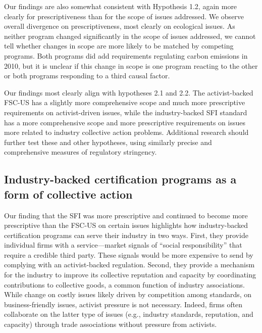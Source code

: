 \documentclass[
      12pt,
            Review ]{article}
\begin{document}
Our findings are also somewhat consistent with Hypothesis 1.2, again
more clearly for prescriptiveness than for the scope of issues
addressed. We observe overall divergence on prescriptiveness, most
clearly on ecological issues. As neither program changed significantly
in the scope of issues addressed, we cannot tell whether changes in
scope are more likely to be matched by competing programs. Both programs
did add requirements regulating carbon emissions in 2010, but it is
unclear if this change in scope is one program reacting to the other or
both programs responding to a third causal factor.

Our findings most clearly align with hypotheses 2.1 and 2.2. The
activist-backed FSC-US has a slightly more comprehensive scope and much
more prescriptive requirements on activist-driven issues, while the
industry-backed SFI standard has a more comprehensive scope and more
prescriptive requirements on issues more related to industry collective
action problems. Additional research should further test these and other
hypotheses, using similarly precise and comprehensive measures of
regulatory stringency.

\subsection{Industry-backed certification programs as a form of
collective
action}\label{industry-backed-certification-programs-as-a-form-of-collective-action}

Our finding that the SFI was more prescriptive and continued to become
more prescriptive than the FSC-US on certain issues highlights how
industry-backed certification programs can serve their industry in two
ways. First, they provide individual firms with a service---market
signals of ``social responsibility'' that require a credible third
party. These signals would be more expensive to send by complying with
an activist-backed regulation. Second, they provide a mechanism for the
industry to improve its collective reputation and capacity by
coordinating contributions to collective goods, a common function of
industry associations. While change on costly issues likely driven by
competition among standards, on business-friendly issues, activist
pressure is not necessary. Indeed, firms often collaborate on the latter
type of issues (e.g., industry standards, reputation, and capacity)
through trade associations without pressure from activists.
\end{document}
